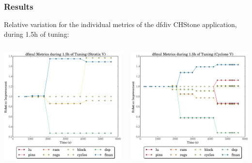 \documentclass[10pt, compress, aspectratio=169]{beamer}
\begin{document}
\begin{frame}
    \frametitle{Results}
    Relative variation for the \alert{individual metrics} of the \alert{dfdiv}
    CHStone application, during \alert{1.5h of tuning}:
    \begin{columns}[T,onlytextwidth]
        \begin{center}
            \includegraphics[width=.92\textwidth]{dfmul_all_5400_chstone_StratixV}
        \end{center}

        \begin{center}
            \includegraphics[width=.92\textwidth]{dfmul_all_5400_chstone_CycloneV}
        \end{center}

    \end{columns}
\end{frame}
\end{document}
